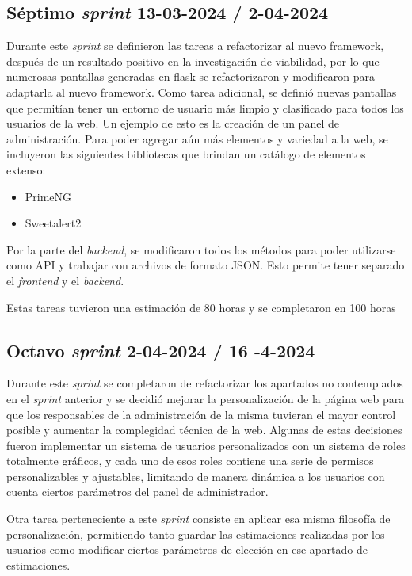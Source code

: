 \subsection{Séptimo \textit{sprint} 13-03-2024 / 2-04-2024}
Durante este \textit{sprint} se definieron las tareas a refactorizar al nuevo framework, después de un resultado positivo en la investigación de viabilidad, por lo que numerosas pantallas generadas en flask se refactorizaron y modificaron para adaptarla al nuevo framework. 
Como tarea adicional, se definió nuevas pantallas que permitían tener un entorno de usuario más limpio y clasificado para todos los usuarios de la web. Un ejemplo de esto es la creación de un panel de administración.
Para poder agregar aún más elementos y variedad a la web, se incluyeron las siguientes bibliotecas que brindan un catálogo de elementos extenso:
\begin{itemize}
    \item PrimeNG
    \item Sweetalert2
\end{itemize}

Por la parte del \textit{backend}, se modificaron todos los métodos para poder utilizarse como API y trabajar con archivos de formato JSON. Esto permite tener separado el \textit{frontend} y el \textit{backend}.

Estas tareas tuvieron una estimación de 80 horas y se completaron en 100 horas


\subsection{Octavo \textit{sprint} 2-04-2024 / 16 -4-2024}
Durante este \textit{sprint} se completaron de refactorizar los apartados no contemplados en el \textit{sprint} anterior y se decidió mejorar la personalización de la página web para que los responsables de la administración de la misma tuvieran el mayor control posible y aumentar la complegidad técnica de la web.
Algunas de estas decisiones fueron implementar un sistema de usuarios personalizados con un sistema de roles totalmente gráficos, y cada uno de esos roles contiene una serie de permisos personalizables y ajustables, limitando de manera dinámica a los usuarios con cuenta ciertos parámetros del panel de administrador.

Otra tarea perteneciente a este \textit{sprint} consiste en aplicar esa misma filosofía de personalización, permitiendo tanto guardar las estimaciones realizadas por los usuarios como modificar ciertos parámetros de elección en ese apartado de estimaciones.

